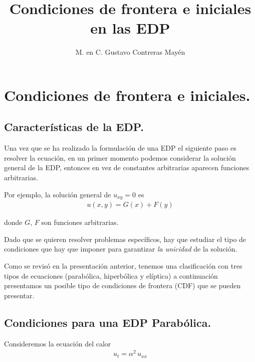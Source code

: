 
\title{Condiciones de frontera e iniciales en las EDP} \vspace{-3ex}
\author{M. en C. Gustavo Contreras Mayén}
\date{ }
\newcommand{\Cancel}[2][black]{{\color{#1}\cancel{\color{black}#2}}}

\vspace{-4cm}
\maketitle
\fontsize{14}{14}\selectfont
\tableofcontents
\newpage

\section{Condiciones de frontera e iniciales.}
\subsection{Características de la EDP.}

Una vez que se ha realizado la formulación de una EDP el siguiente paso es resolver la ecuación, en un primer momento podemos considerar la solución general de la EDP, entonces en vez de constantes arbitrarias aparecen funciones arbitrarias.

Por ejemplo, la solución general de $u_{xy} = 0$ es 
\begin{align*}
u(x, y) = G(x) + F (y)
\end{align*}

donde $G$, $F$ son funciones arbitrarias.

Dado que se quieren resolver problemas específicos, hay que estudiar el tipo de condiciones que hay que imponer para garantizar \emph{la unicidad} de la solución.
\par
Como se revisó en la presentación anterior, tenemos una clasificación con tres tipos de ecuaciones (parabólica, hiperbólica y elíptica) a continuación presentamos un posible tipo de condiciones de frontera (CDF) que se pueden presentar.

\subsection{Condiciones para una EDP Parabólica.}

Consideremos la ecuación del calor
\begin{align*}
u_{t} =  \alpha^{2} \,  u_{xx}
\end{align*}

